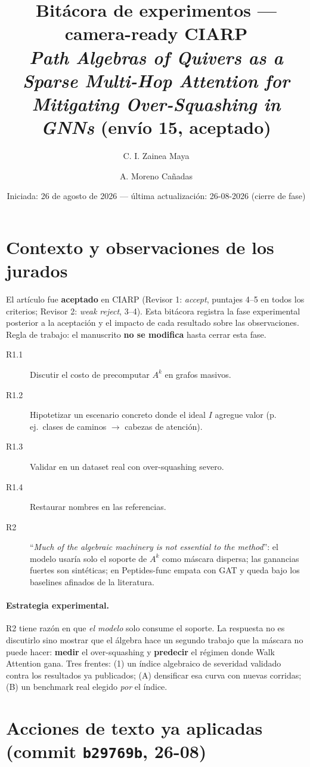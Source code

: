 \documentclass[11pt]{article}
\title{Bit\'acora de experimentos --- camera-ready CIARP\\
\large \emph{Path Algebras of Quivers as a Sparse Multi-Hop Attention
for Mitigating Over-Squashing in GNNs} (env\'io 15, \textbf{aceptado})}
\author{C. I. Zainea Maya \and A. Moreno Ca\~nadas}
\date{Iniciada: 26 de agosto de 2026 --- \'ultima actualizaci\'on: 26-08-2026 (cierre de fase)}
\begin{document}
\maketitle

\section{Contexto y observaciones de los jurados}

El art\'iculo fue \textbf{aceptado} en CIARP (Revisor 1: \emph{accept},
puntajes 4--5 en todos los criterios; Revisor 2: \emph{weak reject}, 3--4).
Esta bit\'acora registra la fase experimental posterior a la aceptaci\'on y el
impacto de cada resultado sobre las observaciones. Regla de trabajo: el
manuscrito \textbf{no se modifica} hasta cerrar esta fase.

\begin{description}
  \item[R1.1] Discutir el costo de precomputar $A^k$ en grafos masivos.
  \item[R1.2] Hipotetizar un escenario concreto donde el ideal $I$ agregue
  valor (p.\,ej.\ clases de caminos $\to$ cabezas de atenci\'on).
  \item[R1.3] Validar en un dataset real con over-squashing severo.
  \item[R1.4] Restaurar nombres en las referencias.
  \item[R2] ``\emph{Much of the algebraic machinery is not essential to the
  method}'': el modelo usar\'ia solo el soporte de $A^k$ como m\'ascara
  dispersa; las ganancias fuertes son sint\'eticas; en Peptides-func empata
  con GAT y queda bajo los baselines afinados de la literatura.
\end{description}

\paragraph{Estrategia experimental.} R2 tiene raz\'on en que \emph{el modelo}
solo consume el soporte. La respuesta no es discutirlo sino mostrar que el
\'algebra hace un segundo trabajo que la m\'ascara no puede hacer:
\textbf{medir} el over-squashing y \textbf{predecir} el r\'egimen donde Walk
Attention gana. Tres frentes: (1) un \'indice algebraico de severidad
validado contra los resultados ya publicados; (A) densificar esa curva con
nuevas corridas; (B) un benchmark real elegido \emph{por} el \'indice.

\section{Acciones de texto ya aplicadas (commit \texttt{b29769b}, 26-08)}
\end{document}
